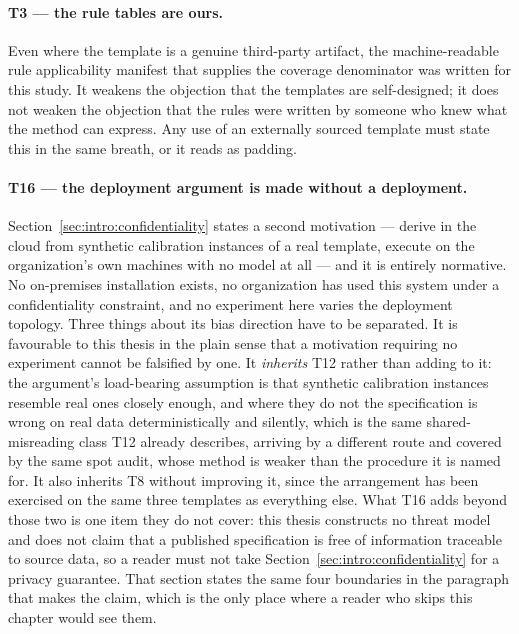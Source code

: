 \paragraph{T3 --- the rule tables are ours.}
Even where the template is a genuine third-party artifact, the machine-readable rule
applicability manifest that supplies the coverage denominator was written for this study. It
weakens the objection that the templates are self-designed; it does not weaken the objection
that the rules were written by someone who knew what the method can express. Any use of an
externally sourced template must state this in the same breath, or it reads as padding.

\paragraph{T16 --- the deployment argument is made without a deployment.}
Section~\ref{sec:intro:confidentiality} states a second motivation --- derive in the cloud from
synthetic calibration instances of a real template, execute on the organization's own machines
with no model at all --- and it is entirely normative. No on-premises installation exists, no
organization has used this system under a confidentiality constraint, and no experiment here
varies the deployment topology. Three things about its bias direction have to be separated. It
is favourable to this thesis in the plain sense that a motivation requiring no experiment
cannot be falsified by one. It \emph{inherits} T12 rather than adding to it: the argument's
load-bearing assumption is that synthetic calibration instances resemble real ones closely
enough, and where they do not the specification is wrong on real data deterministically and
silently, which is the same shared-misreading class T12 already describes, arriving by a
different route and covered by the same spot audit, whose method is weaker than the procedure
it is named for. It also inherits T8
without improving it, since the arrangement has been exercised on the same three templates as
everything else. What T16 adds beyond those two is one item they do not cover: this thesis
constructs no threat model and does not claim that a published specification is free of
information traceable to source data, so a reader must not take
Section~\ref{sec:intro:confidentiality} for a privacy guarantee. That section states the same
four boundaries in the paragraph that makes the claim, which is the only place where a reader
who skips this chapter would see them.


